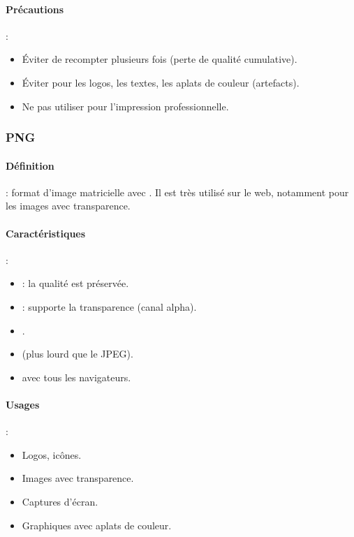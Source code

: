 \paragraph{Précautions} :
\begin{itemize}
    \item Éviter de recompter plusieurs fois (perte de qualité cumulative).
    \item Éviter pour les logos, les textes, les aplats de couleur (artefacts).
    \item Ne pas utiliser pour l'impression professionnelle.
\end{itemize}

\subsubsection{PNG}

\paragraph{Définition} : format d'image matricielle avec . Il est très utilisé sur le web, notamment pour les images avec transparence.

\paragraph{Caractéristiques} :
\begin{itemize}
    \item {} : la qualité est préservée.
    \item {} : supporte la transparence (canal alpha).
    \item {}.
    \item {} (plus lourd que le JPEG).
    \item {} avec tous les navigateurs.
\end{itemize}

\paragraph{Usages} :
\begin{itemize}
    \item Logos, icônes.
    \item Images avec transparence.
    \item Captures d'écran.
    \item Graphiques avec aplats de couleur.
\end{itemize}

